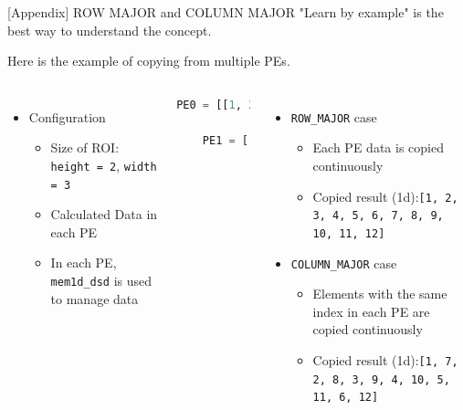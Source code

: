 \documentclass[dvipdfmx, 11pt, aspectratio=169]{beamer}   %
\begin{document}
\begin{frame}[fragile]{[Appendix] ROW MAJOR and COLUMN MAJOR}
"Learn by example" is the best way to understand the concept.

Here is the example of copying from multiple PEs.
\begin{columns}
\begin{itemize}
    \item Configuration
    \begin{itemize}
        \item Size of ROI: \lstinline|height = 2|, \lstinline|width = 3|
        \item Calculated Data in each PE
        \item In each PE, \lstinline|mem1d_dsd| is used to manage data 
    \end{itemize}
\end{itemize}
\begin{lstlisting}[language=python]
    PE0 = [[1, 2, 3],
            [4, 5, 6]]
    PE1 = [[7, 8, 9],
            [10, 11, 12]]
\end{lstlisting}
\begin{itemize}
    \item \lstinline|ROW_MAJOR| case
    \begin{itemize}
        \item Each PE data is copied continuously
        \item Copied result (1d):\lstinline|[1, 2, 3, 4, 5, 6, 7, 8, 9, 10, 11, 12]|
    \end{itemize}
    \item \lstinline|COLUMN_MAJOR| case
    \begin{itemize}
        \item Elements with the same index in each PE are copied continuously
        \item Copied result (1d):\lstinline|[1, 7, 2, 8, 3, 9, 4, 10, 5, 11, 6, 12]|
    \end{itemize}
\end{itemize}
\end{columns}
\end{frame}
\end{document}

